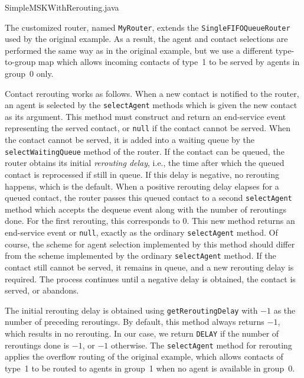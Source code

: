 
{SimpleMSKWithRerouting.java}

The customized router, named \texttt{My\-Router}, extends the
\texttt{Single\-FIFO\-Queue\-Router} used by the original example.
As a result, the agent and contact selections are performed the same
way as in the original example, but we use a different type-to-group
map which allows incoming contacts of type~1 to be served by agents in
group~0 only.

Contact rerouting works as follows.
When a new contact is notified to the router, an agent is selected by
the \texttt{select\-Agent} methods which is given the new contact as
its argument. This method must construct and return an end-service
event representing the served contact, or \texttt{null} if the contact
cannot be served.
When the contact cannot be served, it is added into a waiting queue by
the \texttt{select\-Waiting\-Queue} method of the router.
If the contact can be queued, the router obtains its initial
\emph{rerouting delay}, i.e., the time after which the queued contact
is reprocessed if still in queue.
If this delay is negative, no rerouting happens, which is the default.
When a positive rerouting delay elapses for a queued contact, the
router passes this queued contact to a second \texttt{select\-Agent}
method which accepts the dequeue event along with the number of
reroutings done. For the first rerouting, this corresponds to 0.
This new method returns an end-service event or \texttt{null}, exactly
as the ordinary \texttt{select\-Agent} method.
Of course, the scheme for agent selection implemented by this method
should differ from the scheme implemented by the ordinary
\texttt{select\-Agent} method.
If the contact still cannot be served, it remains in queue, and a new
rerouting delay is required.
The process continues until a negative delay is obtained, the contact
is served, or abandons.

The initial rerouting delay is obtained
using \texttt{get\-Rerouting\-Delay} with
$-1$ as the number of preceding reroutings. By
default, this method always returns $-1$, which results in no rerouting.
In our case, we return \texttt{DELAY} if the number of reroutings done
is $-1$, or $-1$ otherwise.
The \texttt{select\-Agent} method for rerouting applies the overflow
routing of the
original example, which allows contacts of type~1 to be routed to
agents in group~1 when no agent is available in group~0.


